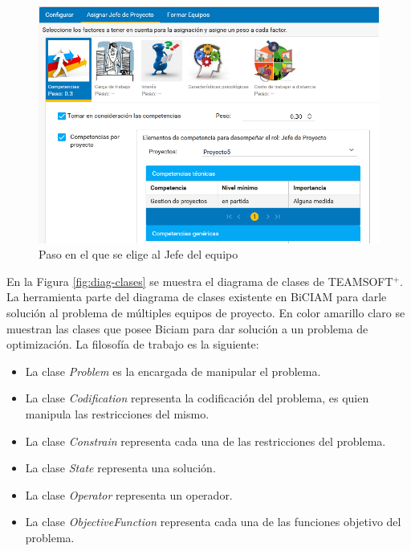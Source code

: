 \begin{figure}[H]
	\centering
	\includegraphics[width=\textwidth]{figuras/conformacion_equipos_asignar_jefe.png}
	\caption{Paso en el que se elige al Jefe del equipo}\label{fig:conf_equip_teamsoft}
\end{figure}

En la Figura \ref{fig:diag-clases} se muestra el diagrama de clases de TEAMSOFT$^+$. La herramienta parte del diagrama de clases existente en BiCIAM para darle solución al problema de múltiples equipos de proyecto. En color amarillo claro se muestran las clases que posee Biciam para dar solución a un problema de optimización. La filosofía de trabajo es la siguiente:
\begin{itemize}
	\item La clase \textit{Problem} es la encargada de manipular el problema.
	\item La clase \textit{Codification} representa la codificación del problema, es quien manipula las restricciones del mismo.
	\item La clase \textit{Constrain} representa cada una de las restricciones del problema.
	\item La clase \textit{State} representa una solución.
	\item La clase \textit{Operator} representa un operador.
	\item La clase \textit{ObjectiveFunction} representa cada una de las funciones objetivo del problema.
\end{itemize}

